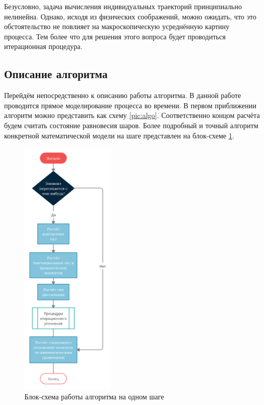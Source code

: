 \documentclass[a4paper]{article}
\begin{document}
Безусловно, задача вычисления индивидуальных траекторий принципиально нелинейна.
Однако, исходя из физических соображений, можно ожидать, что это обстоятельство не повлияет на макроскопическую усреднённую картину процесса.
Тем более что для решения этого вопроса будет проводиться итерационная процедура.



\subsection{Описание алгоритма}

    
Перейдём непосредственно к описанию работы алгоритма.
В данной работе проводится прямое моделирование процесса во времени.
В первом приближении алгоритм можно представить как схему \ref{pic:algo}. 
Соответственно концом расчёта будем считать состояние равновесия шаров.
Более подробный и точный алгоритм конкретной математической модели на шаге представлен на блок-схеме \ref{pic:osn_block}.

\begin{figure}[h!]
	\centering
	\includegraphics[width=0.4\textwidth]{big_block}
	\caption{Блок-схема работы алгоритма на одном шаге}
	\label{pic:osn_block}
\end{figure} 
\end{document}
